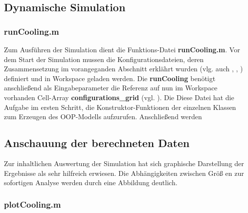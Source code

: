 \subsection*{Dynamische Simulation}
\subsubsection*{runCooling.m}
Zum Ausf\"uhren der Simulation dient die \matlab Funktions-Datei
\textbf{runCooling.m}. Vor dem Start der Simulation mussen die
Konfigurationsdateien, deren Zusammensetzung im vorangeganden Abschnitt
erkl\"ahrt wurden (vlg. auch , ,
) definiert und in \matlab Workspace geladen werden. Die
\textbf{runCooling} ben\"otigt anschlie\ss end als Eingabeparameter die Referenz
auf nun im \matlab Workspace vorhanden Cell-Array \textbf{configurations\_grid}
(vgl. ). Die Diese Datei hat die Aufgabe im ersten
Schritt, die Konstruktor-Funktionen der einzelnen Klassen zum Erzeugen des
OOP-Modells aufzurufen. Anschlie\ss end
werden 
\subsection*{Anschauung der berechneten Daten}
Zur inhaltlichen Auswertung der Simulation hat sich graphische Darstellung der
Ergebnisse als sehr hilfreich erwiesen. Die Abh\"angigkeiten zwischen Gr\"o\ss
en zur sofortigen Analyse werden durch eine Abbildung deutlich.
\subsubsection*{plotCooling.m}

